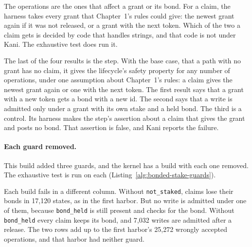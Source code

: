
The operations are the ones that affect a grant or its bond. For a claim,
the harness takes every grant that Chapter~1's rules could give: the
newest grant again if it was not released, or a grant with the next token.
Which of the two a claim gets is decided by code that handles strings, and
that code is not under Kani. The exhaustive test does run it.


The last of the four results is the step. With the base case, that a path
with no grant has no claim, it gives the lifecycle's safety property for
any number of operations, under one assumption about Chapter~1's rules: a
claim gives the newest grant again or one with the next token. The first
result says that a grant with a new token gets a bond with a new id. The
second says that a write is admitted only under a grant with its own stake
and a held bond. The third is a control. Its harness makes the step's
assertion about a claim that gives the grant and posts no bond. That
assertion is false, and Kani reports the failure.

\paragraph{Each guard removed.}
This build added three guards, and the kernel has a build with each one
removed. The exhaustive test is run on each
(Listing~\ref{alg:bonded-stake-guards}).


Each build fails in a different column. Without \texttt{not\_staked},
claims lose their bonds in 17,120 states, as in the first harbor. But no
write is admitted under one of them, because \texttt{bond\_held} is still
present and checks for the bond. Without \texttt{bond\_held} every claim
keeps its bond, and 7,032 writes are admitted after a release. The two
rows add up to the first harbor's 25,272 wrongly accepted operations, and
that harbor had neither guard.

